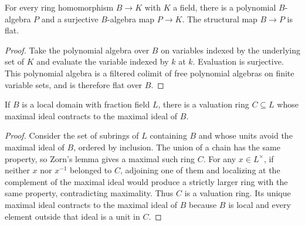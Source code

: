 \begin{lemma}
  \label{lemma:nagata-field-point-polynomial-presentation}

  For every ring homomorphism $B\to K$ with $K$ a field, there is a
  polynomial $B$-algebra $P$ and a surjective $B$-algebra map $P\to K$.
  The structural map $B\to P$ is flat.
\end{lemma}

\begin{proof}
  Take the polynomial algebra over $B$ on variables indexed by the underlying
  set of $K$ and evaluate the variable indexed by $k$ at $k$.  Evaluation is
  surjective.  This polynomial algebra is a filtered colimit of free
  polynomial algebras on finite variable sets, and is therefore flat over
  $B$.
\end{proof}

\begin{lemma}
  \label{lemma:nagata-local-domain-valuation-dominates}
  \leanok

  If $B$ is a local domain with fraction field $L$, there is a valuation ring
  $C\subseteq L$ whose maximal ideal contracts to the maximal ideal of $B$.
\end{lemma}

\begin{proof}
  \leanok
  Consider the set of subrings of $L$ containing $B$ and whose units avoid the
  maximal ideal of $B$, ordered by inclusion.  The union of a chain has the
  same property, so Zorn's lemma gives a maximal such ring $C$.  For any
  $x\in L^\times$, if neither $x$ nor $x^{-1}$ belonged to $C$, adjoining one
  of them and localizing at the complement of the maximal ideal would produce
  a strictly larger ring with the same property, contradicting maximality.
  Thus $C$ is a valuation ring.  Its unique maximal ideal contracts to the
  maximal ideal of $B$ because $B$ is local and every element outside that
  ideal is a unit in $C$.
\end{proof}

